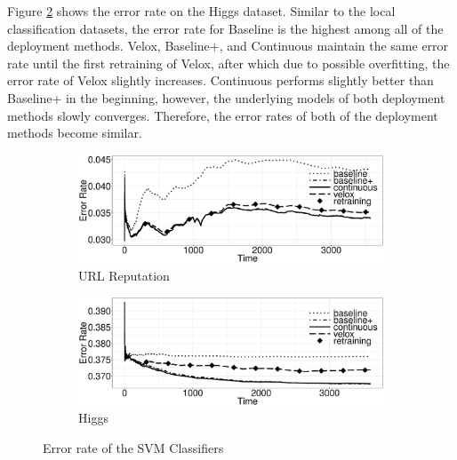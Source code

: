 \documentclass[10pt,conference,letterpaper]{IEEEtran}
\begin{document}
Figure \ref{fig:higgs-quality} shows the error rate on the Higgs dataset.
Similar to the local classification datasets, the error rate for Baseline is the highest among all of the deployment methods.
Velox, Baseline+, and Continuous maintain the same error rate until the first retraining of Velox, after which due to possible overfitting, the error rate of Velox slightly increases.
Continuous performs slightly better than Baseline+ in the beginning, however, the underlying models of both deployment methods slowly converges.
Therefore, the error rates of both of the deployment methods become similar.

\begin{figure}[h]
	\centering
\begin{subfigure}[b]{\columnwidth}
	\includegraphics[width=\columnwidth,height=0.4\columnwidth]{../images/experiment-results/url-reputation-quality.eps}
	\caption{URL Reputation}
	\label{fig:url-quality}
\end{subfigure}
\begin{subfigure}[b]{\columnwidth}
  	\includegraphics[width=\columnwidth,height=0.4\columnwidth]{../images/experiment-results/higgs-quality.eps}
	\caption{Higgs}
	\label{fig:higgs-quality}
\end{subfigure}
\vspace{2mm}
\caption{Error rate of the SVM Classifiers}
\label{fig:cluster-classification-results}
\end{figure}
\end{document}
